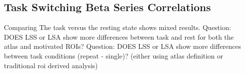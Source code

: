 \documentclass[10pt,letterpaper]{article}
\newlength\savedwidth
\newcommand\thickhline{\noalign{\global\savedwidth\arrayrulewidth\global\arrayrulewidth 2pt}%
\hline
\noalign{\global\arrayrulewidth\savedwidth}}
\newcommand{\lorem}{{\bf LOREM}}
\newcommand{\ipsum}{{\bf IPSUM}}
\begin{document}
\subsection*{Task Switching Beta Series Correlations}
Comparing The task versus the resting state shows mixed results.
Question: DOES LSS or LSA show more differences between task and rest for both
the atlas and motivated ROIs?
Question: DOES LSS or LSA show more differences between task conditions (repeat - single)?
(either using atlas definition or traditional roi derived analysis)


\end{document}
